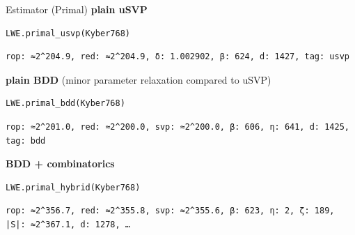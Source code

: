 \documentclass[table,10pt,aspectratio=169]{beamer}
\begin{document}
\begin{frame}[label={sec:orgc4824e5},fragile]{Estimator (Primal)}
 \textbf{plain uSVP}

\lstset{language=Python,label= ,caption= ,captionpos=b,numbers=none}
\begin{lstlisting}
LWE.primal_usvp(Kyber768)
\end{lstlisting}

\begin{verbatim}
rop: ≈2^204.9, red: ≈2^204.9, δ: 1.002902, β: 624, d: 1427, tag: usvp
\end{verbatim}


\textbf{plain BDD} (minor parameter relaxation compared to uSVP)

\lstset{language=Python,label= ,caption= ,captionpos=b,numbers=none}
\begin{lstlisting}
LWE.primal_bdd(Kyber768)
\end{lstlisting}

\begin{verbatim}
rop: ≈2^201.0, red: ≈2^200.0, svp: ≈2^200.0, β: 606, η: 641, d: 1425, tag: bdd
\end{verbatim}


\textbf{BDD + combinatorics}

\lstset{language=Python,label= ,caption= ,captionpos=b,numbers=none}
\begin{lstlisting}
LWE.primal_hybrid(Kyber768)
\end{lstlisting}

\begin{verbatim}
rop: ≈2^356.7, red: ≈2^355.8, svp: ≈2^355.6, β: 623, η: 2, ζ: 189, |S|: ≈2^367.1, d: 1278, …
\end{verbatim}
\end{frame}
\end{document}
